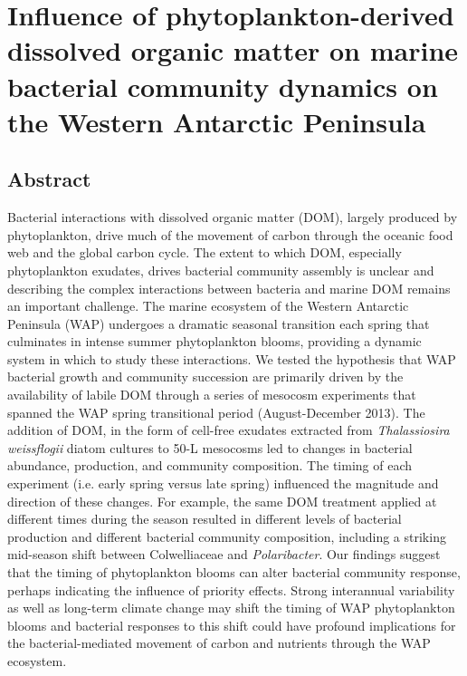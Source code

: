 \chapter{Influence of phytoplankton-derived dissolved organic matter on marine bacterial community dynamics on the Western Antarctic Peninsula}\label{ch:dom}



\section{Abstract}

Bacterial interactions with dissolved organic matter (DOM), largely produced by phytoplankton, drive much of the movement of carbon through the oceanic food web and the global carbon cycle. The extent to which DOM, especially phytoplankton exudates, drives bacterial community assembly is unclear and describing the complex interactions between bacteria and marine DOM remains an important challenge. The marine ecosystem of the Western Antarctic Peninsula (WAP) undergoes a dramatic seasonal transition each spring that culminates in intense summer phytoplankton blooms, providing a dynamic system in which to study these interactions. We tested the hypothesis that WAP bacterial growth and community succession are primarily driven by the availability of labile DOM  through a series of mesocosm experiments that spanned the WAP spring transitional period (August-December 2013). The addition of DOM, in the form of cell-free exudates extracted from \emph{Thalassiosira weissflogii} diatom cultures to 50-L mesocosms led to changes in bacterial abundance, production, and community composition. The timing of each experiment (i.e. early spring versus late spring) influenced the magnitude and direction of these changes. For example, the same DOM treatment applied at different times during the season resulted in different levels of bacterial production and different bacterial community composition, including a striking mid-season shift between Colwelliaceae and \emph{Polaribacter}. Our findings suggest that the timing of phytoplankton blooms can alter bacterial community response, perhaps indicating the influence of priority effects. Strong interannual variability as well as long-term climate change may shift the timing of WAP phytoplankton blooms and bacterial responses to this shift could have profound implications for the bacterial-mediated movement of carbon and nutrients through the WAP ecosystem.

